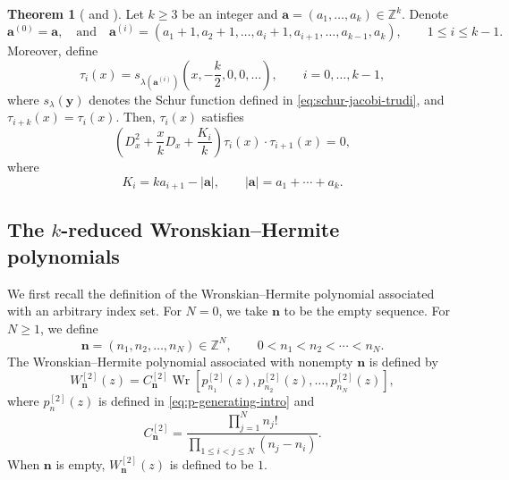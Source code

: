 \documentclass[preprint,3p,10pt]{elsarticle}
\theoremstyle{definition}
\newtheorem{theorem}{Theorem}[section]
\begin{document}
\begin{theorem}[{\cite[Theorem~5.5]{noumi2004painleve}} and {\cite[Theorem~2.4]{tsuda2005universal}}]
\label{thm:Tsuda-Schur-tau}
Let \(k\ge3\) be an integer and \(\mathbf a=(a_1,\ldots,a_k)\in\mathbb Z^k\).  Denote
\begin{equation}
    \mathbf a^{(0)}=\mathbf a, \quad \text{and} \quad 
    \mathbf a^{(i)}
    =
    (a_1+1,a_2+1,\ldots,a_i+1,a_{i+1},\ldots,a_{k-1}, a_k),
    \qquad
    1\le i\le k-1.
\end{equation}
Moreover, define
\begin{equation}
\label{eq:Tsuda-Schur-tau}
    \tau_i(x)
    =
    s_{\lambda\left(\mathbf a^{(i)}\right)}
    \left(x,-\frac{k}{2},0,0,\ldots\right),
    \qquad i=0,\ldots,k-1,
\end{equation}
where $s_{\lambda}\left(\mathbf y\right)$ denotes the Schur function defined in \eqref{eq:schur-jacobi-trudi}, and $\tau_{i+k}(x)=\tau_i(x)$.  Then,
\( \tau_i(x) \) satisfies
\begin{equation}
\label{eq:Tsuda-bilinear}
    \left(
        D_x^2+\frac{x}{k}D_x+\frac{K_i}{k}
    \right)
    \tau_i(x)\cdot\tau_{i+1}(x)=0, 
\end{equation}
where
\begin{equation}
\label{eq:Tsuda-K}
    K_i=ka_{i+1}-|\mathbf a|,
    \qquad
    |\mathbf a|=a_1+\cdots+a_k.
\end{equation}
\end{theorem}


\subsection{The \texorpdfstring{\(k\)-reduced}{k-reduced} Wronskian--Hermite polynomials}
\label{subsec:block-WH-Painleve}

We first recall the definition of the Wronskian--Hermite polynomial associated with an arbitrary
index set. For \(N=0\), we take
\(\mathbf n\) to be the empty sequence. For $N\ge1$, we define 
\begin{equation}
    \mathbf n=(n_1,n_2,\ldots,n_N)\in\mathbb{Z}^N,
    \qquad
    0<n_1<n_2<\cdots<n_N.
\end{equation}
The Wronskian--Hermite polynomial
associated with nonempty \(\mathbf n\) is defined by
\begin{equation}
\label{eq:general-index-WH}
    W_{\mathbf n}^{[2]}(z)
    =
    C_{\mathbf n}^{[2]}
    \operatorname{Wr}
    \left[
        p_{n_1}^{[2]}(z),
        p_{n_2}^{[2]}(z),
        \ldots,
        p_{n_N}^{[2]}(z)
    \right],
\end{equation}
where \(p_n^{[2]}(z)\) is defined in \eqref{eq:p-generating-intro} and
\begin{equation}
\label{eq:general-index-WH-normalization}
    C_{\mathbf n}^{[2]}
    =
    \frac{\prod_{j=1}^{N}n_j!}
    {\prod_{1\le i<j\le N}(n_j-n_i)}.
\end{equation}
When \(\mathbf n\) is empty, $W_{\mathbf n}^{[2]}(z)$ is defined to be $1$. 
\end{document}
